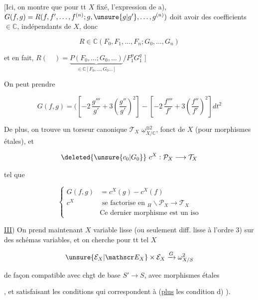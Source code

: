 
[Ici, on montre que  pour tt $X$ fixé, l'expression de a), $G(f,g)=R(f,f',\ldots,f^{(n)};g,\unsure{g|g'},\ldots,g^{(n)})$ doit avoir des coefficients $\in\mathbb C$, indépendants de $X$, donc

\[
R\in\mathbb C(F_0,F_1,\ldots,F_n;G_0,\ldots,G_n)
\]

et en fait, $R(\quad)=\underbrace{P(F_0,\ldots;G_0,\ldots)}_{\in\mathbb C[F_0,\ldots,G_0\ldots]}/F_1^p G_1^q$ \hfill ]

On peut prendre

\[
G(f,g)=\biggl(\left[-2\,\frac{g'''}{g'}+3\left(\frac{g''}{g'}\right)^2\right]-
 \left[-2\,\frac{f'''}{f'}+3\left(\frac{f''}{f'}\right)^2\right]dt^2
\]

De plus, on trouve un torseur canonique $\mathcal T_X$  $\underline\omega^{\otimes2}_{X/\mathbb C}$,  fonct de $X$ (pour morphismes étales), et

\[
\deleted{\unsure{c_0|G_0}}\ c^X:\mathcal P_X\longrightarrow\mathcal T_X
\]

tel que

\[
\left\{\begin{aligned}
G(f,g)&=c^X(g)-c^X(f)\\
c^X&\text{ se factorise en } \!{}_H\backslash\mathcal P_X\longrightarrow\mathcal T_X\\
&\text{Ce dernier morphisme est un iso}
\end{aligned}\right.
\]

\uline{III}) On prend maintenant $X$  variable lisse (ou seulement diff. lisse à l'ordre 3) sur des schémas variables, et on cherche pour tt tel $X$

\[
\unsure{\mathcal E_X|\mathscr E_X}\times\mathcal E_X\xrightarrow{G}\omega^2_{X/S}
\]

de façon compatible avec chgt de base $S'\to S$, avec morphismes étales


, et satisfaisant les conditions qui correspondent à  (\uline{plus} les condition d)   ).

